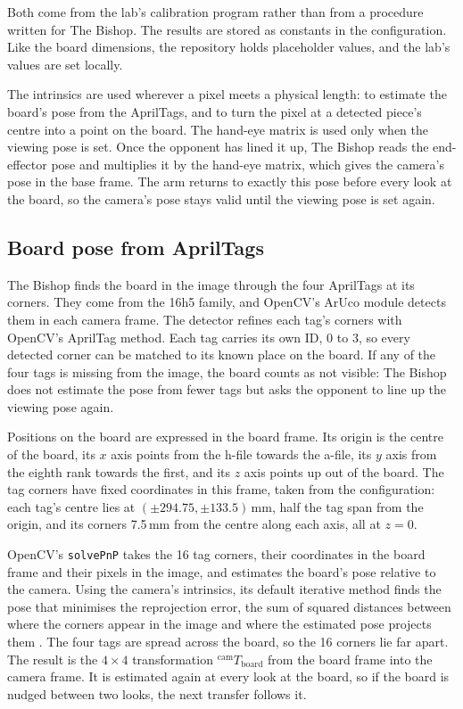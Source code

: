 Both come from the lab's calibration program rather than from a procedure written for The Bishop.
The results are stored as constants in the configuration.
Like the board dimensions, the repository holds placeholder values, and the lab's values are set locally.

The intrinsics are used wherever a pixel meets a physical length: to estimate the board's pose from the AprilTags, and to turn the pixel at a detected piece's centre into a point on the board.
The hand-eye matrix is used only when the viewing pose is set.
Once the opponent has lined it up, The Bishop reads the end-effector pose and multiplies it by the hand-eye matrix, which gives the camera's pose in the base frame.
The arm returns to exactly this pose before every look at the board, so the camera's pose stays valid until the viewing pose is set again.

\subsection{Board pose from AprilTags}
\label{subsec:board-pose}

The Bishop finds the board in the image through the four AprilTags at its corners.
They come from the 16h5 family, and OpenCV's ArUco module \cite{opencv} detects them in each camera frame.
The detector refines each tag's corners with OpenCV's AprilTag method.
Each tag carries its own ID, 0 to 3, so every detected corner can be matched to its known place on the board.
If any of the four tags is missing from the image, the board counts as not visible: The Bishop does not estimate the pose from fewer tags but asks the opponent to line up the viewing pose again.

Positions on the board are expressed in the board frame.
Its origin is the centre of the board, its $x$ axis points from the h-file towards the a-file, its $y$ axis from the eighth rank towards the first, and its $z$ axis points up out of the board.
The tag corners have fixed coordinates in this frame, taken from the configuration: each tag's centre lies at $(\pm 294.75, \pm 133.5)$\,mm, half the tag span from the origin, and its corners 7.5\,mm from the centre along each axis, all at $z = 0$.

OpenCV's \texttt{solvePnP} takes the 16 tag corners, their coordinates in the board frame and their pixels in the image, and estimates the board's pose relative to the camera.
Using the camera's intrinsics, its default iterative method finds the pose that minimises the reprojection error, the sum of squared distances between where the corners appear in the image and where the estimated pose projects them \cite{opencv}.
The four tags are spread across the board, so the 16 corners lie far apart.
The result is the $4 \times 4$ transformation ${}^{\mathrm{cam}}T_{\mathrm{board}}$ from the board frame into the camera frame.
It is estimated again at every look at the board, so if the board is nudged between two looks, the next transfer follows it.

